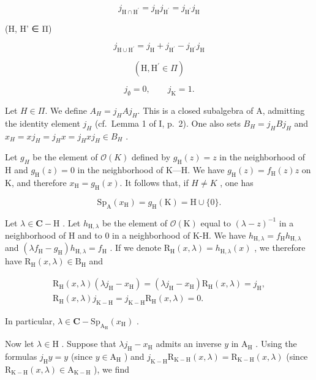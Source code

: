 \[
j _ {\mathrm{H} \cap \mathrm{H} ^ {\prime}} = j _ {\mathrm{H}} j _ {\mathrm{H} ^ {\prime}} = j _ {\mathrm{H} ^ {\prime}} j _ {\mathrm{H}}\tag{15}
\]

(H, H' ∈ Π)

\[
j _ {\mathrm {H\cup H^ {\prime}}} = j _ {\mathrm{H}} + j _ {\mathrm {H^ {\prime}}} - j _ {\mathrm {H^ {\prime}}} j _ {\mathrm{H}}\tag{16}
\]

\[
(\mathrm{H}, \mathrm{H} ^ {\prime} \in \Pi)
\]

\[
j _ {\emptyset} = 0, \qquad j _ {\mathrm{K}} = 1.
\]

Let \(H \in \Pi\). We define \(A_{H} = j_{H}Aj_{H}\). This is a closed subalgebra of A, admitting the identity element \(j_{H}\) (cf.~Lemma 1 of I, p.~2). One also sets \(B_{H} = j_{H}Bj_{H}\) and \(x_{H} = xj_{H} = j_{H}x = j_{H}xj_{H} \in B_{H}\) .

Let \(g_{H}\) be the element of \(\mathcal{O}(K)\) defined by \(g_{\mathrm{H}}(z)=z\) in the neighborhood of H and \(g_{\mathrm{H}}(z)=0\) in the neighborhood of K---H. We have \(g_{\mathrm{H}}(z)=f_{\mathrm{H}}(z)z\) on K, and therefore \(x_{\mathrm{H}}=g_{\mathrm{H}}(x)\). It follows that, if \(H\neq K\) , one has

\[
\mathrm{Sp} _ {\mathrm{A}} (x _ {\mathrm{H}}) = g _ {\mathrm{H}} (\mathrm{K}) = \mathrm{H} \cup \{0 \}.
\]

Let \(\lambda \in \mathbf{C} - \mathrm{H}\) . Let \(h_{\mathrm{H},\lambda}\) be the element of \(\mathcal{O}(\mathrm{K})\) equal to \((\lambda - z)^{-1}\) in a neighborhood of H and to 0 in a neighborhood of K-H. We have \(h_{\mathrm{H},\lambda} = f_{\mathrm{H}}h_{\mathrm{H},\lambda}\) and \((\lambda f_{\mathrm{H}} - g_{\mathrm{H}})h_{\mathrm{H},\lambda} = f_{\mathrm{H}}\) . If we denote \(\mathrm{R_H}(x,\lambda) = h_{\mathrm{H},\lambda}(x)\) , we therefore have \(\mathrm{R_H}(x,\lambda) \in \mathrm{B_H}\) and

\[
\begin{array}{r} \mathrm {R_ {H}} (x, \lambda) (\lambda j _ {\mathrm{H}} - x _ {\mathrm{H}}) = (\lambda j _ {\mathrm{H}} - x _ {\mathrm{H}}) \mathrm {R_ {H}} (x, \lambda) = j _ {\mathrm{H}}, \\ \mathrm {R_ {H}} (x, \lambda) j _ {\mathrm {K-H}} = j _ {\mathrm {K-H}} \mathrm {R_ {H}} (x, \lambda) = 0. \end{array}\tag{17}
\]

In particular, \(\lambda \in \mathbf{C} - \mathrm{Sp}_{\mathrm{A_H}}(x_\mathrm{H})\) .

Now let \(\lambda\in\mathrm{H}\) . Suppose that \(\lambda j_{\mathrm{H}}-x_{\mathrm{H}}\) admits an inverse \(y\) in \(\mathrm{A}_{\mathrm{H}}\) . Using the formulas \(j_{\mathrm{H}}y=y\) (since \(y\in\mathrm{A}_{\mathrm{H}}\) ) and \(j_{\mathrm{K-H}}\mathrm{R}_{\mathrm{K-H}}(x,\lambda)=\mathrm{R}_{\mathrm{K-H}}(x,\lambda)\) (since \(\mathrm{R}_{\mathrm{K-H}}(x,\lambda)\in\mathrm{A}_{\mathrm{K-H}}\) ), we find

